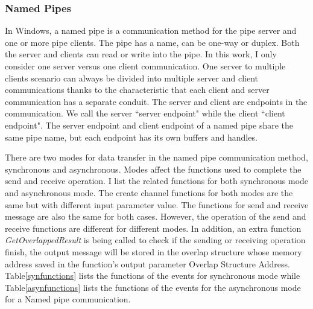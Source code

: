 \subsubsection{Named Pipes}
In Windows, a named pipe is a communication method for the pipe server and one or more pipe clients. The pipe has a name, can be one-way or duplex. Both the server and clients can read or write into the pipe.\cite{WinNamedpipe} In this work, I only consider one server versus one client communication. One server to multiple clients scenario can always be divided into multiple server and client communications thanks to the characteristic that each client and server communication has a separate conduit. The server and client are endpoints in the communication. We call the server ``server endpoint" while the client ``client endpoint".  The server endpoint and client endpoint of a named pipe share the same pipe name, but each endpoint has its own buffers and handles. 

There are two modes for data transfer in the named pipe communication method, synchronous and asynchronous.  Modes affect the functions used to complete the send and receive operation. I list the related functions for both synchronous mode and asynchronous mode. The create channel functions for both modes are the same but with different input parameter value. The functions for send and receive message are also the same for both cases. However, the operation of the send and receive functions are different for different modes. In addition, an extra function \textit{GetOverlappedResult} is being called to check if the sending or receiving operation finish, the output message will be stored in the overlap structure whose memory address saved in the function's output parameter Overlap Structure Address. Table\ref{synfunctions} lists the functions of the events for synchronous mode while Table\ref{asynfunctions} lists the functions of the events for the asynchronous mode for a Named pipe communication.

